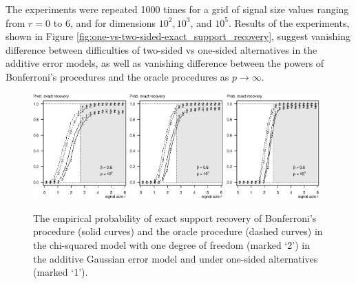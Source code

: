 The experiments were repeated 1000 times for a grid of signal size values ranging from $r=0$ to $6$, and for dimensions $10^2, 10^3$, and $10^5$.
Results of the experiments, shown in Figure \ref{fig:one-vs-two-sided-exact_support_recovery}, suggest vanishing difference between difficulties of two-sided vs one-sided alternatives in the additive error models, as well as vanishing difference between the powers of Bonferroni's procedures and the oracle procedures as $p\to\infty$.

\begin{figure}
      \centering
      \includegraphics[width=0.32\textwidth]{sim_one-vs-two-sided/exact_recovery_one-vs-two-sided_beta06_p100.eps}
      \includegraphics[width=0.32\textwidth]{sim_one-vs-two-sided/exact_recovery_one-vs-two-sided_beta06_p1000.eps}
      \includegraphics[width=0.32\textwidth]{sim_one-vs-two-sided/exact_recovery_one-vs-two-sided_beta06_p100000.eps}
      \caption{The empirical probability of exact support recovery of Bonferroni's procedure (solid curves) and the oracle procedure (dashed curves) in the chi-squared model with one degree of freedom (marked `2') in the additive Gaussian error model and under one-sided alternatives (marked `1'). 
}
\end{figure}
